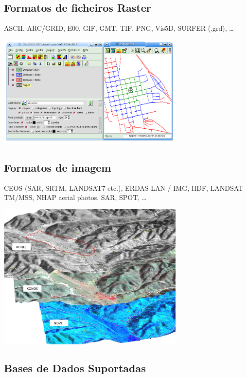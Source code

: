 \documentclass[notumble,a4paper,10pt,nofoldmark]{leaflet}
\newenvironment{myfig}[1][0pt plus 1.5ex minus .5ex]{\par\vspace*{#1}\begin{minipage}{\textwidth}\centering}{\end{minipage}}
\begin{document}
\subsection{Formatos de ficheiros Raster}
ASCII, ARC/GRID, E00, GIF, GMT, TIF, PNG, Vis5D, SURFER (.grd), \dots
\begin{myfig}
\includegraphics[width=0.7\textwidth]{isodist}
\end{myfig}

\subsection{Formatos de imagem}

CEOS (SAR, SRTM, LANDSAT7 etc.), ERDAS LAN / IMG, HDF, LANDSAT TM/MSS, NHAP aerial photos, SAR, SPOT, \dots
\begin{myfig}[1.5ex]
\includegraphics[width=0.7\textwidth]{ndvi}
\end{myfig}

\subsection{Bases de Dados Suportadas}
\end{document}
